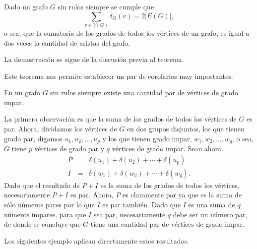 \begin{teorema}
Dado un grafo $G$ sin rulos siempre se cumple que 
\[
\sum_{v\in V(G)}\delta_G(v)=2|E(G)|,
\]
o sea, que la sumatoria de los grados de todos los vértices de un grafo, es igual a dos veces la cantidad de aristas del grafo.

\begin{demostracion}
La demostración se sigue de la discusión previa al teorema.
\end{demostracion}
\end{teorema}

Este teorema nos permite establecer un par de corolarios muy importantes.

\begin{corolario}
En un grafo $G$ sin rulos siempre existe una cantidad par de vértices de grado impar.

\begin{demostracion}
La primera observación es que la suma de los grados de todos los vértices de $G$ es par.
%
Ahora, dividamos los vértices de $G$ en dos grupos disjuntos, los que tienen grado par, digamos $u_1,u_2,\ldots,u_p$ y los que tienen grado impar, $w_1,w_2,\ldots,w_q$, o sea, $G$ tiene $p$ vértices de grado par y $q$ vértices de grado impar.
Sean ahora
\[
\begin{array}{rcl}
P &=& \delta(u_1) + \delta(u_2) + \cdots + \delta(u_p) \\
I &=& \delta(w_1) + \delta(w_2) + \cdots + \delta(w_q).
\end{array}
\]
Dado que el resultado de $P+I$ es la suma de los grados de todos los vértices, necesariamente $P+I$ es par.
Ahora, $P$ es claramente par ya que es la suma de sólo números pares por lo que $I$ es par también.
Dado que $I$ es una suma de $q$ números impares, para que $I$ sea par, necesariamente $q$ debe ser un número par, de donde se concluye que $G$ tiene una cantidad par de vértices de grado impar.
\end{demostracion}
\end{corolario}

Los siguientes ejemplo aplican directamente estos resultados.


